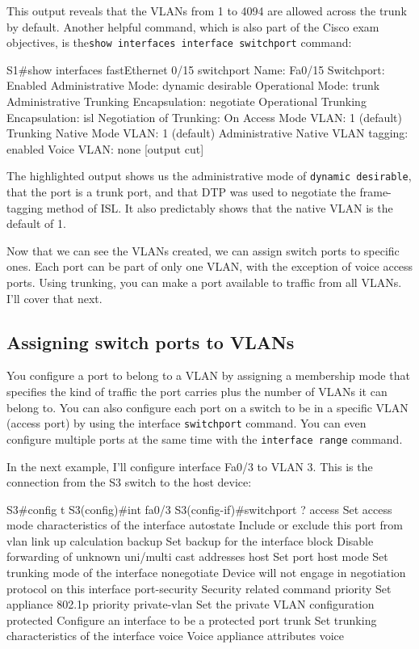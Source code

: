 This output reveals that the VLANs from 1 to 4094 are allowed across the trunk by default.
Another helpful command, which is also part of the Cisco exam objectives, is the\texttt{show\ interfaces\ interface\ switchport} command:

\begin{cli}
S1#show interfaces fastEthernet 0/15 switchport
Name: Fa0/15
Switchport: Enabled
Administrative Mode: dynamic desirable
Operational Mode: trunk
Administrative Trunking Encapsulation: negotiate
Operational Trunking Encapsulation: isl
Negotiation of Trunking: On
Access Mode VLAN: 1 (default)
Trunking Native Mode VLAN: 1 (default)
Administrative Native VLAN tagging: enabled
Voice VLAN: none
[output cut]
\end{cli}

The highlighted output shows us the administrative mode of
\texttt{dynamic\ desirable}, that the port is a trunk port, and that DTP was used to negotiate the frame-tagging method of ISL.
It also predictably shows that the native VLAN is the default of 1.

Now that we can see the VLANs created, we can assign switch ports to specific ones.
Each port can be part of only one VLAN, with the exception of voice access ports.
Using trunking, you can make a port available to traffic from all VLANs.
I'll cover that next.

\subsection{Assigning switch ports to VLANs}

You configure a port to belong to a VLAN by assigning a membership mode
that specifies the kind of traffic the port carries plus the number of
VLANs it can belong to. You can also configure each port on a switch to
be in a specific VLAN (access port) by using the interface
\texttt{switchport} command. You can even configure multiple ports at
the same time with the \texttt{interface\ range} command.

In the next example, I'll configure interface Fa0/3 to VLAN 3. This is
the connection from the S3 switch to the host device:

\begin{cli}
S3#config t
S3(config)#int fa0/3
S3(config-if)#switchport ?
  access         Set access mode characteristics of the interface
  autostate      Include or exclude this port from vlan link up calculation
  backup         Set backup for the interface
  block          Disable forwarding of unknown uni/multi cast addresses
  host           Set port host
  mode           Set trunking mode of the interface
  nonegotiate    Device will not engage in negotiation protocol on this
                 interface
  port-security  Security related command
  priority       Set appliance 802.1p priority
  private-vlan   Set the private VLAN configuration
  protected      Configure an interface to be a protected port
  trunk          Set trunking characteristics of the interface
  voice          Voice appliance attributes voice
\end{cli}

